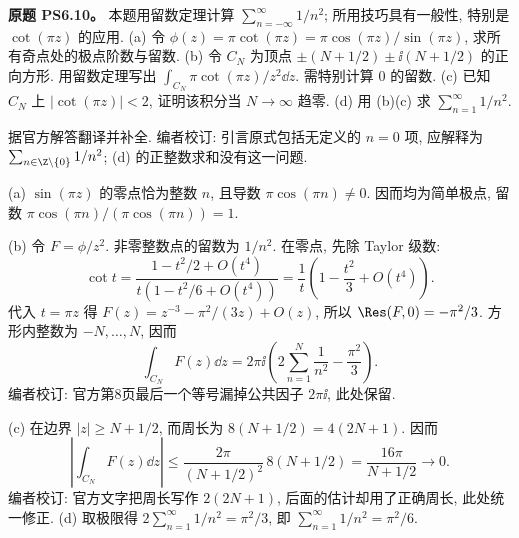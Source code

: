 \begin{exercise}
\textbf{原题 PS6.10。}\label{ass:ps6-10}
本题用留数定理计算 $\sum_{n=-\infty}^{\infty}1/n^2$; 所用技巧具有一般性, 特别是 $\cot(\pi z)$ 的应用.
(a) 令 $\phi(z)=\pi\cot(\pi z)=\pi\cos(\pi z)/\sin(\pi z)$, 求所有奇点处的极点阶数与留数.
(b) 令 $C_N$ 为顶点 $\pm(N+1/2)\pm\ii(N+1/2)$ 的正向方形. 用留数定理写出 $\int_{C_N}\pi\cot(\pi z)/z^2\dd z$. 需特别计算 $0$ 的留数.
(c) 已知 $C_N$ 上 $|\cot(\pi z)|<2$, 证明该积分当 $N\to\infty$ 趋零.
(d) 用 (b)(c) 求 $\sum_{n=1}^\infty1/n^2$.
\end{exercise}
\begin{solution}
据官方解答翻译并补全. 编者校订: 引言原式包括无定义的 $n=0$ 项, 应解释为 $\sum_{n\in\Z\setminus\{0\}}1/n^2$; (d) 的正整数求和没有这一问题.

(a) $\sin(\pi z)$ 的零点恰为整数 $n$, 且导数 $\pi\cos(\pi n)\ne0$. 因而均为简单极点, 留数 $\pi\cos(\pi n)/(\pi\cos(\pi n))=1$.

(b) 令 $F=\phi/z^2$. 非零整数点的留数为 $1/n^2$. 在零点, 先除 Taylor 级数:
\[
 \cot t=\frac{1-t^2/2+O(t^4)}{t(1-t^2/6+O(t^4))}
 =\frac1t\left(1-\frac{t^2}3+O(t^4)\right).
\]
代入 $t=\pi z$ 得 $F(z)=z^{-3}-\pi^2/(3z)+O(z)$, 所以 $\Res(F,0)=-\pi^2/3$.
方形内整数为 $-N,\ldots,N$, 因而
\[
 \int_{C_N}F(z)\dd z
 =2\pi\ii\left(2\sum_{n=1}^N\frac1{n^2}-\frac{\pi^2}3\right).
\]
编者校订: 官方第8页最后一个等号漏掉公共因子 $2\pi\ii$, 此处保留.
\begin{center}
\end{center}
(c) 在边界 $|z|\ge N+1/2$, 而周长为 $8(N+1/2)=4(2N+1)$. 因而
\[
 \left|\int_{C_N}F(z)\dd z\right|
 \le \frac{2\pi}{(N+1/2)^2}\,8(N+1/2)
 =\frac{16\pi}{N+1/2}\longrightarrow0.
\]
编者校订: 官方文字把周长写作 $2(2N+1)$, 后面的估计却用了正确周长, 此处统一修正.
(d) 取极限得 $2\sum_{n=1}^\infty1/n^2=\pi^2/3$, 即 $\sum_{n=1}^\infty1/n^2=\pi^2/6$.
\end{solution}

